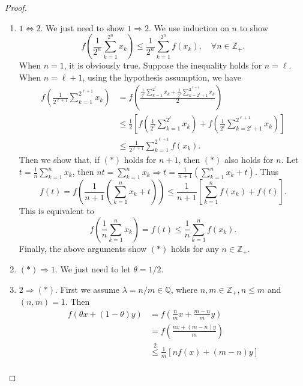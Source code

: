 \documentclass[12pt]{article}
\renewcommand{\(}{\left(}%
\renewcommand{\)}{\right)}%
\renewcommand{\[}{\left[}%
\renewcommand{\]}{\right]}%
\newcommand{\z}{\mathbb{Z}}
\newcommand{\q}{\mathbb{Q}}
\newtheorem{proof}{Proof.}}
\begin{document}
\begin{proof}
	\begin{enumerate}
		\item $1\Leftrightarrow 2$. We just need to show $1\Rightarrow2$. We use induction on $n$ to show 
		\begin{equation*}
			f\(\frac{1}{2^n}\sum_{k=1}^{2^n}x_k \)\leq \frac{1}{2^n}\sum_{k=1}^{2^n}f(x_k),\quad \forall n\in\z_+.
		\end{equation*}
		When $n=1$, it is obviously true. Suppose the inequality holds for $n=\ell$. When $n=\ell+1$, using the hypothesis assumption, we have
		\begin{equation*}
			\begin{split}
				f\(\frac{1}{2^{\ell+1}}\sum_{k=1}^{2^{\ell+1}}x_k \)&=f\( \frac{\frac{1}{2^\ell} \sum_{k=1}^{2^\ell}x_k+\frac{1}{2^\ell} \sum_{k=2^\ell+1}^{2^{\ell+1}}x_k}{2}\)\\
				&\leq \frac{1}{2}\[f\(\frac{1}{2^\ell} \sum_{k=1}^{2^\ell}x_k \)+f\(\frac{1}{2^\ell} \sum_{k=2^\ell+1}^{2^{\ell+1}}x_k\)\]\\
				&\leq \frac{1}{2^{\ell+1}}\sum_{k=1}^{2^{\ell+1}}f(x_k).
			\end{split}
		\end{equation*}
		Then we show that, if $(*)$ holds for $n+1$, then $(*)$ also holds for $n$. Let $t=\frac{1}{n}\sum_{k=1}^{n}x_k$, then $nt=\sum_{k=1}^{n}x_k\Longrightarrow t=\frac{1}{n+1}(\sum_{k=1}^{n}x_k+t)$. Thus
		\begin{equation*}
			f(t)=f\(\frac{1}{n+1}\(\sum_{k=1}^{n}x_k+t\)\)\leq \frac{1}{n+1}\[\sum_{k=1}^nf(x_k)+f(t)\].
		\end{equation*}
		This is equivalent to
		\begin{equation*}
			f\(\frac{1}{n}\sum_{k=1}^{n}x_k\)=f(t)\leq \frac{1}{n}\sum_{k=1}^nf(x_k).
		\end{equation*}
		Finally, the above arguments show $(*)$ holds for any $n\in\z_+$.
		\item $(*)\Rightarrow1$. We just need to let $\theta=1/2$. 
		\item $2\Rightarrow(*)$. First we assume $\lambda=n/m\in\q$, where $n,m\in\z_+,n\leq m$ and $(n,m)=1$. Then 
		\begin{equation*}
			\begin{split}
				f\(\theta x+(1-\theta)y\)&=f\(\frac{n}{m} x+\frac{m-n}{m}y \)\\
				&=f\(\frac{nx+(m-n)y}{m}\)\\
				&\overset{2}{\leq} \frac{1}{m}\[nf(x)+(m-n)y\]\\

\end{split}
\end{equation*}
\end{enumerate}
\end{proof}
\end{document}
